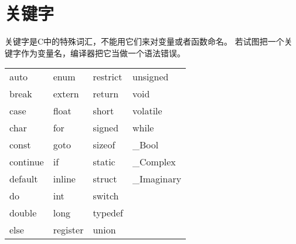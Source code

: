 \section{关键字}
\begin{frame}[fragile]\ft{\secname}
关键字是C中的特殊词汇，不能用它们来对变量或者函数命名。
若试图把一个关键字作为变量名，编译器把它当做一个语法错误。
\end{frame}

\begin{frame}[fragile]\ft{\secname}
\begin{table}
\centering
\begin{tabular}{p{2cm}|p{2cm}|p{2cm}|p{2cm}}\hline
auto & enum & restrict & unsigned \\
break & extern & return & void \\
case & float & short & volatile \\
char & for & signed & while \\
const & goto & sizeof & \_Bool \\
continue & if & static & \_Complex \\
default & inline & struct & \_Imaginary\\
do & int & switch &  \\
double & long & typedef & \\
else & register & union \\ \hline
\end{tabular}
\end{table}
\end{frame}









